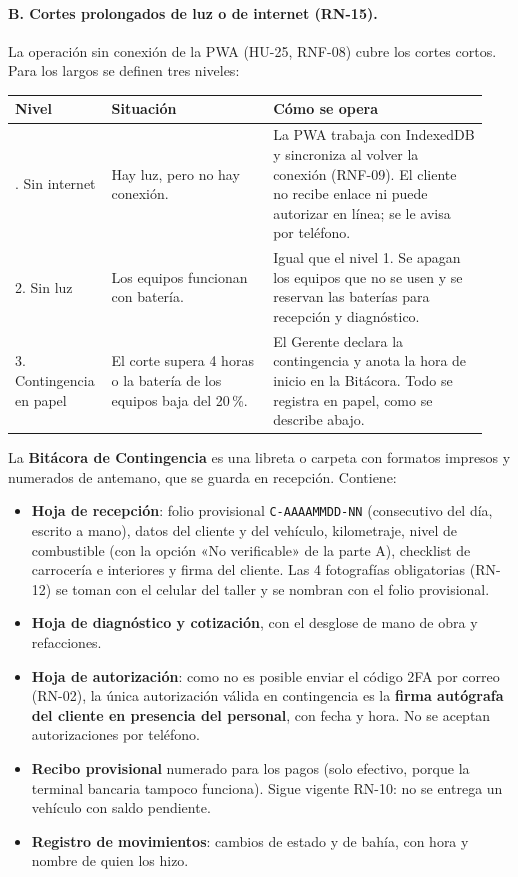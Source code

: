 \paragraph{B. Cortes prolongados de luz o de internet (RN-15).}

La operación sin conexión de la PWA (HU-25, RNF-08) cubre los cortes
cortos. Para los largos se definen tres niveles:

{\small
\begin{longtable}{@{}L{0.17\linewidth}L{0.33\linewidth}L{0.44\linewidth}@{}}
\toprule
\textbf{Nivel} & \textbf{Situación} & \textbf{Cómo se opera} \\
\midrule
\endhead
\bottomrule
{}. Sin internet & Hay luz, pero no hay conexión. & La PWA trabaja con
IndexedDB y sincroniza al volver la conexión (RNF-09). El cliente no
recibe enlace ni puede autorizar en línea; se le avisa por teléfono. \\
2. Sin luz & Los equipos funcionan con batería. & Igual que el nivel 1. Se
apagan los equipos que no se usen y se reservan las baterías para
recepción y diagnóstico. \\
3. Contingencia en papel & El corte supera 4 horas o la batería de los
equipos baja del 20\,\%. & El Gerente declara la contingencia y anota la
hora de inicio en la Bitácora. Todo se registra en papel, como se describe
abajo. \\
\end{longtable}
}

La \textbf{Bitácora de Contingencia} es una libreta o carpeta con formatos
impresos y numerados de antemano, que se guarda en recepción. Contiene:

\begin{itemize}
\tightlist
\item \textbf{Hoja de recepción}: folio provisional \texttt{C-AAAAMMDD-NN}
(consecutivo del día, escrito a mano), datos del cliente y del vehículo,
kilometraje, nivel de combustible (con la opción «No verificable» de la
parte A), checklist de carrocería e interiores y firma del cliente. Las 4
fotografías obligatorias (RN-12) se toman con el celular del taller y se
nombran con el folio provisional.
\item \textbf{Hoja de diagnóstico y cotización}, con el desglose de mano de
obra y refacciones.
\item \textbf{Hoja de autorización}: como no es posible enviar el código
2FA por correo (RN-02), la única autorización válida en contingencia es la
\textbf{firma autógrafa del cliente en presencia del personal}, con fecha y
hora. No se aceptan autorizaciones por teléfono.
\item \textbf{Recibo provisional} numerado para los pagos (solo efectivo,
porque la terminal bancaria tampoco funciona). Sigue vigente RN-10: no se
entrega un vehículo con saldo pendiente.
\item \textbf{Registro de movimientos}: cambios de estado y de bahía, con
hora y nombre de quien los hizo.
\end{itemize}

